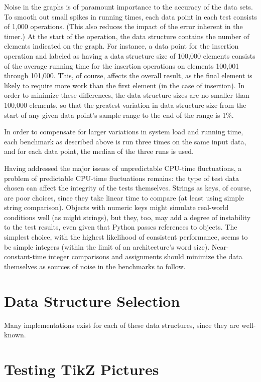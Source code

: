 \documentclass{article}
\begin{document}
Noise in the graphs is of paramount importance to the accuracy of the data sets. To smooth out small spikes in running times, each data point in each test consists of 1,000 operations. (This also reduces the impact of the error inherent in the timer.) At the start of the operation, the data structure contains the number of elements indicated on the graph. For instance, a data point for the insertion operation and labeled as having a data structure size of 100,000 elements consists of the average running time for the insertion operations on elements 100,001 through 101,000. This, of course, affects the overall result, as the final element is likely to require more work than the first element (in the case of insertion). In order to minimize these differences, the data structure sizes are no smaller than 100,000 elements, so that the greatest variation in data structure size from the start of any given data point's sample range to the end of the range is 1\%.

In order to compensate for larger variations in system load and running time, each benchmark as described above is run three times on the same input data, and for each data point, the median of the three runs is used.

Having addressed the major issues of unpredictable CPU-time fluctuations, a problem of predictable CPU-time fluctuations remains: the type of test data chosen can affect the integrity of the tests themselves. Strings as keys, of course, are poor choices, since they take linear time to compare (at least using simple string comparison). Objects with numeric keys might simulate real-world conditions well (as might strings), but they, too, may add a degree of instability to the test results, even given that Python passes references to objects. The simplest choice, with the highest likelihood of consistent performance, seems to be simple integers (within the limit of an architecture's word size). Near-constant-time integer comparisons and assignments should minimize the data themselves as sources of noise in the benchmarks to follow.

\section{Data Structure Selection}
Many implementations exist for each of these data structures, since they are well-known. 

\newpage
\section{Testing TikZ Pictures}




\end{document}
